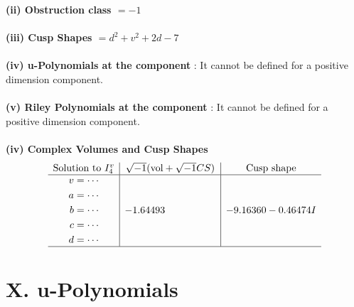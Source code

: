 \documentclass[1p]{elsarticle_modified}
\theoremstyle{definition}
\newcommand{\I}{\sqrt{-1}}
\begin{document}
\flushleft \textbf{(ii) Obstruction class $= -1$}\\~\\
\flushleft \textbf{(iii) Cusp Shapes $= d^2+v^2+2 d-7$}\\~\\
\flushleft \textbf{(iv) u-Polynomials at the component} : It cannot be defined for a positive dimension component.\\~\\
\flushleft \textbf{(v) Riley Polynomials at the component} : It cannot be defined for a positive dimension component.\\~\\
\newpage\flushleft \textbf{(iv) Complex Volumes and Cusp Shapes}
$$\begin{array}{c|c|c} 
\text{Solution to }I^v_{4}& \I (\text{vol} + \sqrt{-1}CS) & \text{Cusp shape}\\
 \hline 
\begin{aligned}
v &= \cdots \\
a &= \cdots \\
b &= \cdots \\
c &= \cdots \\
d &= \cdots\end{aligned}
 & -1.64493\phantom{ +0.000000I} & -9.16360 - 0.46474 I\\
 \hline 
 \end{array}
$$
\newpage\renewcommand{\arraystretch}{1}
\centering \section*{ X. u-Polynomials}
\end{document}

